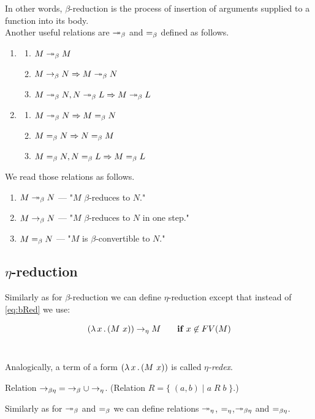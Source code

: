 \documentclass[12pt,a4paper]{report}
\begin{document}
In other words, $\beta$-reduction is the process 
of insertion of arguments supplied to a function into 
its body. \\

Another useful relations are $\twoheadrightarrow_\beta$ and $=_\beta$ defined as follows. 

\begin{enumerate}
 \item \begin{enumerate}
 	\item $M \twoheadrightarrow_\beta M$
 	\item $M \rightarrow_\beta N \Rightarrow M \twoheadrightarrow_\beta N$
 	\item $M \twoheadrightarrow_\beta N , N \twoheadrightarrow_\beta L \Rightarrow M \twoheadrightarrow_\beta L$ 	
 \end{enumerate}
 \item \begin{enumerate}
 	\item $M \twoheadrightarrow_\beta N \Rightarrow M =_\beta N$
 	\item $M =_\beta N \Rightarrow N =_\beta M$
 	\item $M =_\beta N , N =_\beta L \Rightarrow M =_\beta L$
 \end{enumerate}

\end{enumerate}

We read those relations as follows.
\begin{enumerate}
 	\item $M \twoheadrightarrow_\beta N$ --- "$M$ $\beta$-reduces to $N$."  
 	\item $M \rightarrow_\beta N$  --- "$M$ $\beta$-reduces to $N$
 	      in one step."
 	\item $M =_\beta N$ --- "$M$ is $\beta$-convertible to $N$."	
 \end{enumerate}



\subsection{$\eta$-reduction}

Similarly as for $\beta$-reduction we can define $\eta$-reduction 
except that instead of \ref{eq:bRed} we use:  

$$( \lambda \, x \, . \, (M~x) ) \rightarrow_\eta M \textbf{ ~~~~if } x \not\in FV(M) $$~

Analogically, a term of a form $( \lambda \, x \, . \, (M~x) )$ is called 
\textit{$\eta$-redex}.

Relation $\rightarrow_{\beta\eta}\;=\;\rightarrow_\beta \cup \rightarrow_\eta$. 
(Relation $R = \{\;(a,b)\;|\;a\;R\;b\;\}$.)

Similarly as for $\twoheadrightarrow_\beta$ and $=_\beta$ we can define relations 
$\twoheadrightarrow_\eta$, $=_\eta$,$\twoheadrightarrow_{\beta\eta}$ and $=_{\beta\eta}$.
\end{document}
